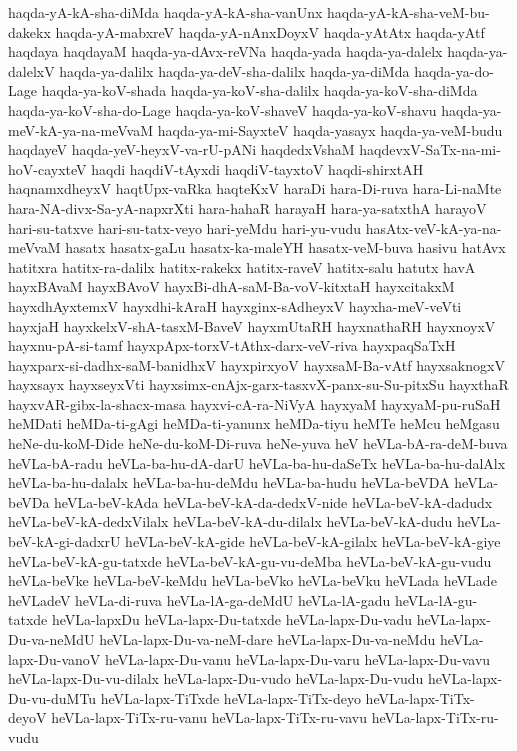 {haqda-yA-kA-sha-diMda
haqda-yA-kA-sha-vanUnx
haqda-yA-kA-sha-veM-bu-dakekx
haqda-yA-mabxreV
haqda-yA-nAnxDoyxV
haqda-yAtAtx
haqda-yAtf
haqdaya
haqdayaM
haqda-ya-dAvx-reVNa
haqda-yada
haqda-ya-dalelx
haqda-ya-dalelxV
haqda-ya-dalilx
haqda-ya-deV-sha-dalilx
haqda-ya-diMda
haqda-ya-do-Lage
haqda-ya-koV-shada
haqda-ya-koV-sha-dalilx
haqda-ya-koV-sha-diMda
haqda-ya-koV-sha-do-Lage
haqda-ya-koV-shaveV
haqda-ya-koV-shavu
haqda-ya-meV-kA-ya-na-meVvaM
haqda-ya-mi-SayxteV
haqda-yasayx
haqda-ya-veM-budu
haqdayeV
haqda-yeV-heyxV-va-rU-pANi
haqdedxVshaM
haqdevxV-SaTx-na-mi-hoV-cayxteV
haqdi
haqdiV-tAyxdi
haqdiV-tayxtoV
haqdi-shirxtAH
haqnamxdheyxV
haqtUpx-vaRka
haqteKxV
haraDi
hara-Di-ruva
hara-Li-naMte
hara-NA-divx-Sa-yA-napxrXti
hara-hahaR
harayaH
hara-ya-satxthA
harayoV
hari-su-tatxve
hari-su-tatx-veyo
hari-yeMdu
hari-yu-vudu
hasAtx-veV-kA-ya-na-meVvaM
hasatx
hasatx-gaLu
hasatx-ka-maleYH
hasatx-veM-buva
hasivu
hatAvx
hatitxra
hatitx-ra-dalilx
hatitx-rakekx
hatitx-raveV
hatitx-salu
hatutx
havA
hayxBAvaM
hayxBAvoV
hayxBi-dhA-saM-Ba-voV-kitxtaH
hayxcitakxM
hayxdhAyxtemxV
hayxdhi-kAraH
hayxginx-sAdheyxV
hayxha-meV-veVti
hayxjaH
hayxkelxV-shA-tasxM-BaveV
hayxmUtaRH
hayxnathaRH
hayxnoyxV
hayxnu-pA-si-tamf
hayxpApx-torxV-tAthx-darx-veV-riva
hayxpaqSaTxH
hayxparx-si-dadhx-saM-banidhxV
hayxpirxyoV
hayxsaM-Ba-vAtf
hayxsaknogxV
hayxsayx
hayxseyxVti
hayxsimx-cnAjx-garx-tasxvX-panx-su-Su-pitxSu
hayxthaR
hayxvAR-gibx-la-shacx-masa
hayxvi-cA-ra-NiVyA
hayxyaM
hayxyaM-pu-ruSaH
heMDati
heMDa-ti-gAgi
heMDa-ti-yanunx
heMDa-tiyu
heMTe
heMcu
heMgasu
heNe-du-koM-Dide
heNe-du-koM-Di-ruva
heNe-yuva
heV
heVLa-bA-ra-deM-buva
heVLa-bA-radu
heVLa-ba-hu-dA-darU
heVLa-ba-hu-daSeTx
heVLa-ba-hu-dalAlx
heVLa-ba-hu-dalalx
heVLa-ba-hu-deMdu
heVLa-ba-hudu
heVLa-beVDA
heVLa-beVDa
heVLa-beV-kAda
heVLa-beV-kA-da-dedxV-nide
heVLa-beV-kA-dadudx
heVLa-beV-kA-dedxVilalx
heVLa-beV-kA-du-dilalx
heVLa-beV-kA-dudu
heVLa-beV-kA-gi-dadxrU
heVLa-beV-kA-gide
heVLa-beV-kA-gilalx
heVLa-beV-kA-giye
heVLa-beV-kA-gu-tatxde
heVLa-beV-kA-gu-vu-deMba
heVLa-beV-kA-gu-vudu
heVLa-beVke
heVLa-beV-keMdu
heVLa-beVko
heVLa-beVku
heVLada
heVLade
heVLadeV
heVLa-di-ruva
heVLa-lA-ga-deMdU
heVLa-lA-gadu
heVLa-lA-gu-tatxde
heVLa-lapxDu
heVLa-lapx-Du-tatxde
heVLa-lapx-Du-vadu
heVLa-lapx-Du-va-neMdU
heVLa-lapx-Du-va-neM-dare
heVLa-lapx-Du-va-neMdu
heVLa-lapx-Du-vanoV
heVLa-lapx-Du-vanu
heVLa-lapx-Du-varu
heVLa-lapx-Du-vavu
heVLa-lapx-Du-vu-dilalx
heVLa-lapx-Du-vudo
heVLa-lapx-Du-vudu
heVLa-lapx-Du-vu-duMTu
heVLa-lapx-TiTxde
heVLa-lapx-TiTx-deyo
heVLa-lapx-TiTx-deyoV
heVLa-lapx-TiTx-ru-vanu
heVLa-lapx-TiTx-ru-vavu
heVLa-lapx-TiTx-ru-vudu
}
